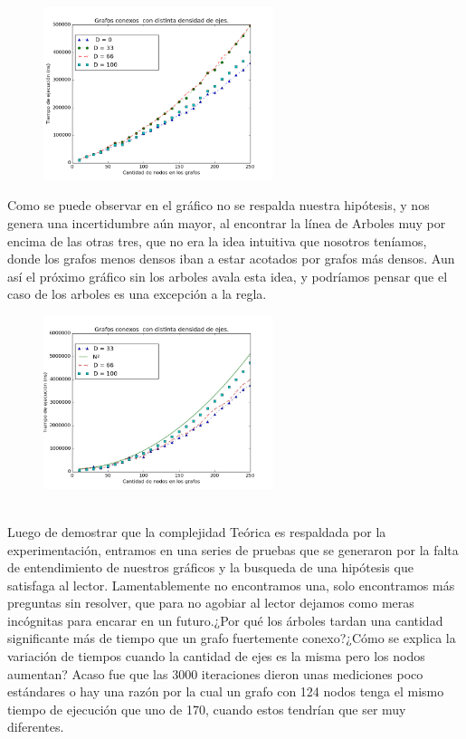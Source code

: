 \documentclass[spanish,12pt]{article}
\begin{document}
\begin{figure}[H]
\centering
\includegraphics[width=0.6\textwidth]{VariasDensidades}
\caption{}
\end{figure}

Como se puede observar en el gráfico no se respalda nuestra hipótesis, y nos genera una incertidumbre aún mayor, al encontrar la línea de Arboles muy por encima de las otras tres, que no era la idea intuitiva que nosotros teníamos, donde los grafos menos densos iban a estar acotados por grafos más densos. Aun así el próximo gráfico sin los arboles avala esta idea, y podríamos pensar que el caso de los arboles es una excepción a la regla.

\begin{figure}[H]
\centering
\includegraphics     [width=0.6\textwidth]{VariasDensidadesSinArbol}
\caption{}
\end{figure}

\\
Luego de demostrar que la complejidad Teórica es respaldada por la experimentación, entramos en una series de pruebas que se generaron por la falta de entendimiento de nuestros gráficos y la busqueda de una hipótesis que satisfaga al lector. Lamentablemente no encontramos una, solo encontramos más preguntas sin resolver, que para no agobiar al lector dejamos como meras incógnitas para encarar en un futuro.¿Por qué los árboles tardan una cantidad significante más de tiempo que un grafo fuertemente conexo?¿Cómo se explica la variación de tiempos cuando la cantidad de ejes es la misma pero los nodos aumentan? Acaso fue que las 3000 iteraciones dieron unas mediciones poco estándares o hay una razón por la cual un grafo con 124 nodos tenga el mismo tiempo de ejecución que uno de 170, cuando estos tendrían que ser muy diferentes.  


\\

\\
\\
\end{document}
